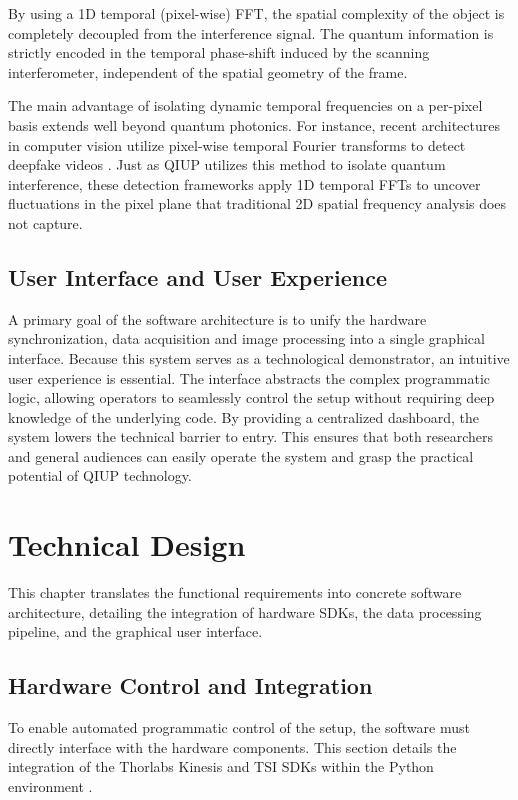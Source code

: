 \documentclass[12pt,a4paper]{article}
\begin{document}
    By using a 1D temporal (pixel-wise) \ac{FFT}, the spatial complexity of the object is completely decoupled from the interference signal. The quantum information is strictly encoded in the temporal phase-shift induced by the scanning interferometer, independent of the spatial geometry of the frame.
    
    The main advantage of isolating dynamic temporal frequencies on a per-pixel basis extends well beyond quantum photonics. For instance, recent architectures in computer vision utilize pixel-wise temporal Fourier transforms to detect deepfake videos \cite{kim2025beyond}. Just as \ac{QIUP} utilizes this method to isolate quantum interference, these detection frameworks apply 1D temporal \ac{FFT}s to uncover fluctuations in the pixel plane that traditional 2D spatial frequency analysis does not capture.
    
\subsection{User Interface and User Experience}
    A primary goal of the software architecture is to unify the hardware synchronization, data acquisition and image processing into a single graphical interface. Because this system serves as a technological demonstrator, an intuitive user experience is essential. The interface abstracts the complex programmatic logic, allowing operators to seamlessly control the setup without requiring deep knowledge of the underlying code. By providing a centralized dashboard, the system lowers the technical barrier to entry. This ensures that both researchers and general audiences can easily operate the system and grasp the practical potential of \ac{QIUP} technology.

\newpage

\section{Technical Design}
This chapter translates the functional requirements into concrete software architecture, detailing the integration of hardware SDKs, the data processing pipeline, and the graphical user interface.

\subsection{Hardware Control and Integration}
    To enable automated programmatic control of the setup, the software must directly interface with the hardware components. This section details the integration of the Thorlabs Kinesis and \ac{TSI} \acp{SDK} within the Python environment \cite{ThorlabsKinesis, TSIDocs}.
\end{document}

